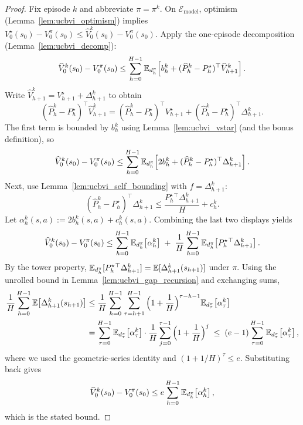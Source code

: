 \begin{proof}
Fix episode $k$ and abbreviate $\pi=\pi^k$. On $\mathcal{E}_{\mathrm{model}}$, optimism
(Lemma~\ref{lem:ucbvi_optimism}) implies
$V_0^\star(s_0)-V_0^\pi(s_0)\le \widehat V_0^k(s_0)-V_0^\pi(s_0)$.
Apply the one-episode decomposition (Lemma~\ref{lem:ucbvi_decomp}):
\[
\widehat V_0^k(s_0)-V_0^\pi(s_0)
\le
\sum_{h=0}^{H-1}\mathbb{E}_{d_h^{\pi}}\!\left[b_h^k + (\widehat P_h^k-P_h^\star)^\top \widehat V_{h+1}^k\right].
\]
Write $\widehat V_{h+1}^k=V_{h+1}^\star+\Delta_{h+1}^k$ to obtain
\[
(\widehat P_h^k-P_h^\star)^\top \widehat V_{h+1}^k
=
(\widehat P_h^k-P_h^\star)^\top V_{h+1}^\star
+
(\widehat P_h^k-P_h^\star)^\top \Delta_{h+1}^k.
\]
The first term is bounded by $b_h^k$ using Lemma~\ref{lem:ucbvi_vstar} (and the bonus definition),
so
\[
\widehat V_0^k(s_0)-V_0^\pi(s_0)
\le
\sum_{h=0}^{H-1}\mathbb{E}_{d_h^{\pi}}\!\left[2b_h^k + (\widehat P_h^k-P_h^\star)^\top \Delta_{h+1}^k\right].
\]
Next, use Lemma~\ref{lem:ucbvi_self_bounding} with $f=\Delta_{h+1}^k$:
\[
(\widehat P_h^k-P_h^\star)^\top \Delta_{h+1}^k
\le
\frac{P_h^\star{}^\top \Delta_{h+1}^k}{H} + c_h^k.
\]
Let $\alpha_h^k(s,a):=2b_h^k(s,a)+c_h^k(s,a)$. Combining the last two displays yields
\[
\widehat V_0^k(s_0)-V_0^\pi(s_0)
\le
\sum_{h=0}^{H-1}\mathbb{E}_{d_h^{\pi}}\!\left[\alpha_h^k\right]
\;+\;
\frac{1}{H}\sum_{h=0}^{H-1}\mathbb{E}_{d_h^{\pi}}\!\left[P_h^\star{}^\top \Delta_{h+1}^k\right].
\]
By the tower property, $\mathbb{E}_{d_h^\pi}[P_h^\star{}^\top \Delta_{h+1}^k]=\mathbb{E}[\Delta_{h+1}^k(s_{h+1})]$ under $\pi$.
Using the unrolled bound in Lemma~\ref{lem:ucbvi_gap_recursion} and exchanging sums,
\begin{align*}
\frac{1}{H}\sum_{h=0}^{H-1}\mathbb{E}\!\left[\Delta_{h+1}^k(s_{h+1})\right]
&\le
\frac{1}{H}\sum_{h=0}^{H-1}\sum_{\tau=h+1}^{H-1}\Big(1+\frac{1}{H}\Big)^{\tau-h-1}\mathbb{E}_{d_\tau^\pi}\!\left[\alpha_\tau^k\right] \\
&=
\sum_{\tau=0}^{H-1}\mathbb{E}_{d_\tau^\pi}\!\left[\alpha_\tau^k\right]\cdot
\frac{1}{H}\sum_{j=0}^{\tau-1}\Big(1+\frac{1}{H}\Big)^{j}
\;\le\;
(e-1)\sum_{\tau=0}^{H-1}\mathbb{E}_{d_\tau^\pi}\!\left[\alpha_\tau^k\right],
\end{align*}
where we used the geometric-series identity and $(1+1/H)^\tau\le e$.
Substituting back gives
\[
\widehat V_0^k(s_0)-V_0^\pi(s_0)
\le
e\sum_{h=0}^{H-1}\mathbb{E}_{d_h^{\pi}}\!\left[\alpha_h^k\right],
\]
which is the stated bound.
\end{proof}

